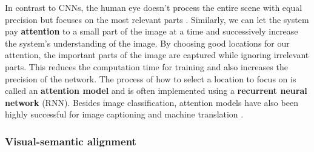 In contrast to CNNs, the human eye doesn't process the entire scene with equal precision but focuses on the most relevant parts \cite{DeepMindAttention}.
Similarly, we can let the system pay \textbf{attention} to a small part of the image at a time and successively increase the system's understanding of the image.
By choosing good locations for our attention, the important parts of the image are captured while ignoring irrelevant parts.
This reduces the computation time for training and also increases the precision of the network. The process of how to select a location to focus on is called an \textbf{attention model} and is often implemented using a \textbf{recurrent neural network} (RNN). Besides image classification, attention models have also been highly successful for image captioning \cite{AttendAndTell} and machine translation \cite{machine_translation_attention}.

\subsubsection{Visual-semantic alignment}

